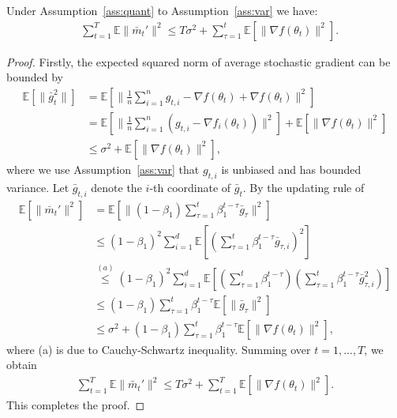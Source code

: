 \documentclass[11pt]{article}
\begin{document}
\begin{Lemma} \label{lemma:m_t,m_t'}
Under Assumption~\ref{ass:quant} to Assumption~\ref{ass:var} we have:
\begin{align*}
    &\sum_{t=1}^T\mathbb E\|\bar m_t'\|^2\leq T\sigma^2+\sum_{\tau=1}^t \mathbb E[\|\nabla f(\theta_t)\|^2].
\end{align*}
\end{Lemma}

\begin{proof}
Firstly, the expected squared norm of average stochastic gradient can be bounded by
\begin{align*}
    \mathbb E[\|\bar g_t^2\|]&=\mathbb E[\|\frac{1}{n}\sum_{i=1}^n g_{t,i}-\nabla f(\theta_t)+\nabla f(\theta_t)\|^2]\\
    &=\mathbb E[\|\frac{1}{n}\sum_{i=1}^n (g_{t,i}-\nabla f_i(\theta_t))\|^2]+\mathbb E[\|\nabla f(\theta_t)\|^2]\\
    &\leq \sigma^2+\mathbb E[\|\nabla f(\theta_t)\|^2],
\end{align*}
where we use Assumption~\ref{ass:var} that $g_{t,i}$ is unbiased and has bounded variance. Let $\bar g_{t,i}$ denote the $i$-th coordinate of $\bar g_t$. By the updating rule of \algo\ 
\begin{align*}
    \mathbb E[\|\bar m_t'\|^2]&=\mathbb E[\|(1-\beta_1)\sum_{\tau=1}^t\beta_1^{t-\tau} \bar g_\tau\|^2]\\
    &\leq (1-\beta_1)^2\sum_{i=1}^d \mathbb E[(\sum_{\tau=1}^t\beta_1^{t-\tau} \bar g_{\tau,i})^2]\\
    &\overset{(a)}{\leq} (1-\beta_1)^2\sum_{i=1}^d \mathbb E[(\sum_{\tau=1}^t\beta_1^{t-\tau})(\sum_{\tau=1}^t\beta_1^{t-\tau} \bar g_{\tau,i}^2)]\\
    &\leq (1-\beta_1)\sum_{\tau=1}^t \beta_1^{t-\tau}\mathbb E[\|\bar g_\tau\|^2]\\
    &\leq \sigma^2+(1-\beta_1)\sum_{\tau=1}^t \beta_1^{t-\tau}\mathbb E[\|\nabla f(\theta_t)\|^2],
\end{align*}
where (a) is due to Cauchy-Schwartz inequality. Summing over $t=1,...,T$, we obtain
\begin{align*}
    \sum_{t=1}^T\mathbb E\|\bar m_t'\|^2\leq T\sigma^2+\sum_{t=1}^T \mathbb E[\|\nabla f(\theta_t)\|^2].
\end{align*}
This completes the proof.

\end{proof}


\end{document}

